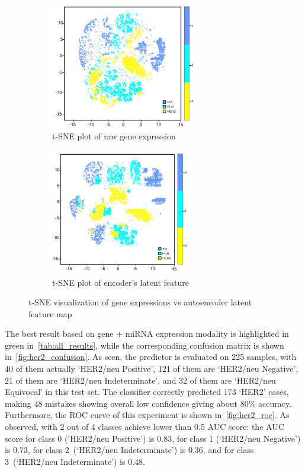 \begin{figure}[h]
	\centering
	\begin{subfigure}{.48\linewidth}
		\centering
		\includegraphics[width=0.9\linewidth,height=55mm]{images/raw_tsne.png}
		\caption{t-SNE plot of raw gene expression}
        \label{fig:tsne_raw}
	\end{subfigure}
	\begin{subfigure}{0.48\linewidth}
		\centering
		\includegraphics[width=0.9\linewidth,height=55mm]{images/ae_tsne.png}
		\caption{t-SNE plot of encoder's latent feature}
        \label{fig:tsne_ae}
	\end{subfigure}
	 \setlength{\belowcaptionskip}{-8pt}
	\caption{t-SNE visualization of gene expressions vs autoencoder latent feature map~\cite{karimACCESS2019}} 
	\label{fig:tnse}
	\vspace{-4mm}
\end{figure}

\hspace*{3.5mm} The best result based on gene + miRNA expression modality is highlighted in green in~\cref{tab:all_results}, while the corresponding confusion matrix is shown in~\cref{fig:her2_confusion}. As seen, the predictor is evaluated on 225 samples, with 40 of them actually `HER2/neu Positive', 121 of them are `HER2/neu Negative', 21 of them are `HER2/neu Indeterminate', and 32 of them are `HER2/neu Equivocal' in this test set. The classifier correctly predicted 173 `HER2' cases, making 48 mistakes showing overall low confidence giving about 80\% accuracy. Furthermore, the ROC curve of this experiment is shown in~\cref{fig:her2_roc}. As observed, with 2 out of 4 classes achieve lower than 0.5 AUC score: the AUC score for class 0 (`HER2/neu Positive') is 0.83, for class 1 (`HER2/neu Negative') is 0.73, for class 2~(`HER2/neu Indeterminate') is 0.36, and for class 3~(`HER2/neu Indeterminate') is 0.48. 

